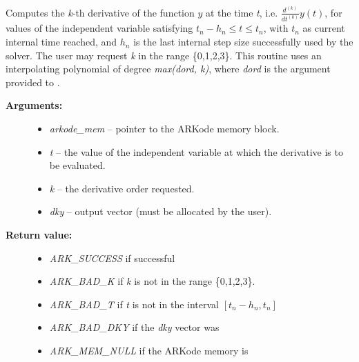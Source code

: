 \documentclass[letterpaper,10pt,english]{sphinxmanual}
\begin{document}
\begin{fulllineitems}
\label{c_interface/User_callable:c.ARKodeGetDky}
Computes the \emph{k}-th derivative of the function
\(y\) at the time \emph{t},
i.e. \(\frac{d^{(k)}}{dt^{(k)}}y(t)\), for values of the
independent variable satisfying \(t_n-h_n \le t \le t_n\), with
\(t_n\) as current internal time reached, and \(h_n\) is
the last internal step size successfully used by the solver.  The
user may request \emph{k} in the range \{0,1,2,3\}.  This routine uses an
interpolating polynomial of degree \emph{max(dord, k)}, where \emph{dord} is the
argument provided to {\hyperref[c_interface/User_callable:c.ARKodeSetDenseOrder]{\emph{}}}.
\begin{description}
\item[{\textbf{Arguments:}}] \leavevmode\begin{itemize}
\item {} 
\emph{arkode\_mem} -- pointer to the ARKode memory block.

\item {} 
\emph{t} -- the value of the independent variable at which the
derivative is to be evaluated.

\item {} 
\emph{k} -- the derivative order requested.

\item {} 
\emph{dky} -- output vector (must be allocated by the user).

\end{itemize}

\item[{\textbf{Return value:}}] \leavevmode\begin{itemize}
\item {} 
\emph{ARK\_SUCCESS} if successful

\item {} 
\emph{ARK\_BAD\_K} if \emph{k} is not in the range \{0,1,2,3\}.

\item {} 
\emph{ARK\_BAD\_T} if \emph{t} is not in the interval \([t_n-h_n, t_n]\)

\item {} 
\emph{ARK\_BAD\_DKY} if the \emph{dky} vector was 

\item {} 
\emph{ARK\_MEM\_NULL} if the ARKode memory is 


\end{itemize}
\end{description}
\end{fulllineitems}
\end{document}
